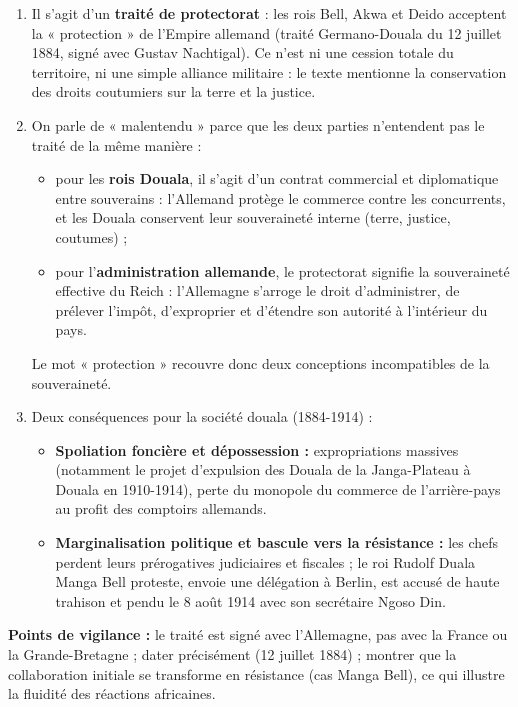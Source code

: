 \documentclass[11pt]{article}
\begin{document}
\begin{corrige}
\begin{enumerate}
    \item Il s'agit d'un \textbf{traité de protectorat} : les rois Bell, Akwa et Deido acceptent la « protection » de l'Empire allemand (traité Germano-Douala du 12 juillet 1884, signé avec Gustav Nachtigal). Ce n'est ni une cession totale du territoire, ni une simple alliance militaire : le texte mentionne la conservation des droits coutumiers sur la terre et la justice.
    \item On parle de « malentendu » parce que les deux parties n'entendent pas le traité de la même manière :
    \begin{itemize}
        \item pour les \textbf{rois Douala}, il s'agit d'un contrat commercial et diplomatique entre souverains : l'Allemand protège le commerce contre les concurrents, et les Douala conservent leur souveraineté interne (terre, justice, coutumes) ;
        \item pour l'\textbf{administration allemande}, le protectorat signifie la souveraineté effective du Reich : l'Allemagne s'arroge le droit d'administrer, de prélever l'impôt, d'exproprier et d'étendre son autorité à l'intérieur du pays.
    \end{itemize}
    Le mot « protection » recouvre donc deux conceptions incompatibles de la souveraineté.
    \item Deux conséquences pour la société douala (1884-1914) :
    \begin{itemize}
        \item \textbf{Spoliation foncière et dépossession :} expropriations massives (notamment le projet d'expulsion des Douala de la Janga-Plateau à Douala en 1910-1914), perte du monopole du commerce de l'arrière-pays au profit des comptoirs allemands.
        \item \textbf{Marginalisation politique et bascule vers la résistance :} les chefs perdent leurs prérogatives judiciaires et fiscales ; le roi Rudolf Duala Manga Bell proteste, envoie une délégation à Berlin, est accusé de haute trahison et pendu le 8 août 1914 avec son secrétaire Ngoso Din.
    \end{itemize}
\end{enumerate}
\textbf{Points de vigilance :} le traité est signé avec l'Allemagne, pas avec la France ou la Grande-Bretagne ; dater précisément (12 juillet 1884) ; montrer que la collaboration initiale se transforme en résistance (cas Manga Bell), ce qui illustre la fluidité des réactions africaines.
\end{corrige}
\end{document}
